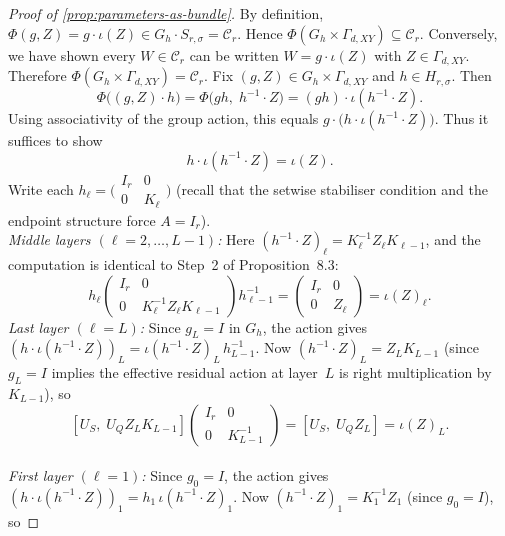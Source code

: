 \documentclass{article}
\theoremstyle{definition}
\begin{document}
\begin{proof}[Proof of \ref{prop:parameters-as-bundle}]\label{proof:parameters-as-bundle}
    By definition, $\Phi(g, Z) = g \cdot \iota(Z) \in G_h \cdot S_{r,\sigma} = \mathcal{C}_r$.  Hence $\Phi(G_h \times \Gamma_{d,XY}) \subseteq \mathcal{C}_r$.  Conversely, we have shown every $W \in \mathcal{C}_r$ can be written $W = g \cdot \iota(Z)$ with $Z \in \Gamma_{d,XY}$.  Therefore $\Phi(G_h \times \Gamma_{d,XY}) = \mathcal{C}_r$.
Fix $(g, Z) \in G_h \times \Gamma_{d,XY}$ and $h \in H_{r,\sigma}$.  Then
\[
\Phi\bigl((g, Z) \cdot h\bigr) = \Phi\bigl(gh,\; h^{-1} \cdot Z\bigr)
= (gh) \cdot \iota(h^{-1} \cdot Z).
\]
Using associativity of the group action, this equals $g \cdot \bigl(h \cdot \iota(h^{-1} \cdot Z)\bigr)$.  Thus it suffices to show
\begin{equation}\tag{$\star$}
h \cdot \iota(h^{-1} \cdot Z) = \iota(Z).
\end{equation}
Write each $h_\ell = \bigl(\begin{smallmatrix} I_r & 0 \\ 0 & K_\ell \end{smallmatrix}\bigr)$ (recall that the setwise stabiliser condition and the endpoint structure force $A = I_r$).
\noindent
\\
\emph{Middle layers $(\ell = 2, \dots, L{-}1)$:}  Here $(h^{-1} \cdot Z)_\ell = K_\ell^{-1} Z_\ell K_{\ell-1}$, and the computation is identical to Step~2 of Proposition~8.3:
\[
h_\ell \begin{pmatrix} I_r & 0 \\ 0 & K_\ell^{-1} Z_\ell K_{\ell-1} \end{pmatrix} h_{\ell-1}^{-1}
= \begin{pmatrix} I_r & 0 \\ 0 & Z_\ell \end{pmatrix} = \iota(Z)_\ell.
\]
\noindent
\emph{Last layer $(\ell = L)$:}  Since $g_L = I$ in $G_h$, the action gives $(h \cdot \iota(h^{-1} \cdot Z))_L = \iota(h^{-1} \cdot Z)_L \, h_{L-1}^{-1}$.  Now $(h^{-1} \cdot Z)_L = Z_L K_{L-1}$ (since $g_L = I$ implies the effective residual action at layer~$L$ is right multiplication by $K_{L-1}$), so
\[
[U_S,\; U_Q Z_L K_{L-1}]
\begin{pmatrix} I_r & 0 \\ 0 & K_{L-1}^{-1} \end{pmatrix}
= [U_S,\; U_Q Z_L] = \iota(Z)_L.
\]
\\
\noindent
\emph{First layer $(\ell = 1)$:}  Since $g_0 = I$, the action gives $(h \cdot \iota(h^{-1} \cdot Z))_1 = h_1 \, \iota(h^{-1} \cdot Z)_1$.  Now $(h^{-1} \cdot Z)_1 = K_1^{-1} Z_1$ (since $g_0 = I$), so

\end{proof}
\end{document}
